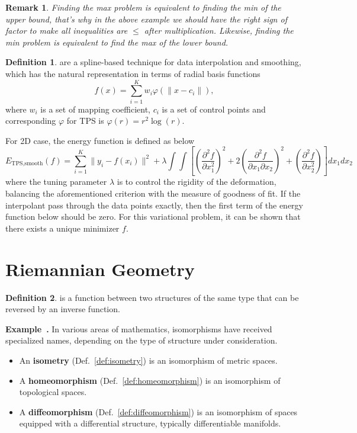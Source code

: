 \documentclass[a4paper]{article}
\theoremstyle{definition}
\newtheorem{definition}{Definition}
\theoremstyle{plain}
\newtheorem{remark}{Remark}
\newenvironment{example}[1][]{\refstepcounter{example}\par\medskip
   \noindent \textbf{Example~\theexample. #1} \rmfamily}{\medskip}
\newcounter{example}{Example}
\begin{document}
\begin{remark}
Finding the max problem is equivalent to finding the min of the upper bound, that's why in the above example we should have the right sign of factor to make all inequalities are $\le$ after multiplication. Likewise, finding the min problem is equivalent to find the max of the lower bound.
\end{remark}

\begin{definition}
 are a spline-based technique for data interpolation and smoothing, which has the natural representation in terms of radial basis functions
\begin{equation*}
    f(x)=\sum^K_{i=1}w_i\varphi(\|x-c_i\|),
\end{equation*}
where $w_i$ is a set of mapping coefficient, $c_i$ is a set of control points and corresponding $\varphi$ for TPS is $\varphi(r)=r^2\log(r)$.

For 2D case, the energy function is defined as below
\begin{equation*}
    E_{\text{TPS},\text{smooth}}(f)=\sum^K_{i=1}\|y_i-f(x_i)\|^2+\lambda\int\int\left[\left(\frac{\partial^2 f}{\partial x^2_1}\right)^2+2\left(\frac{\partial^2f}{\partial x_1\partial x_2}\right)^2+\left(\frac{\partial^2f}{\partial x_2^2}\right)\right]dx_1dx_2
\end{equation*}
where the tuning parameter $\lambda$ is to control the rigidity of the deformation, balancing the aforementioned criterion with the measure of goodness of fit. If the interpolant pass through the data points exactly, then the first term of the energy function below should be zero. For this variational problem, it can be shown that there exists a unique minimizer $f$.
\end{definition}

\newpage
\section{Riemannian Geometry}
\begin{definition}
\cite{fletcher,hao,zhang} is a function between two structures of the same type that can be reversed by an inverse function.
\end{definition}

\begin{example}
In various areas of mathematics, isomorphisms have received specialized names, depending on the type of structure under consideration.
\begin{itemize}
    \item An \textbf{isometry} (Def.~\ref{def:isometry}) is an isomorphism of metric spaces.
    \item A \textbf{homeomorphism} (Def.~\ref{def:homeomorphism}) is an isomorphism of topological spaces.
    \item A \textbf{diffeomorphism} (Def.~\ref{def:diffeomorphism}) is an isomorphism of spaces equipped with a differential structure, typically differentiable manifolds.
\end{itemize}
\end{example}
\end{document}
